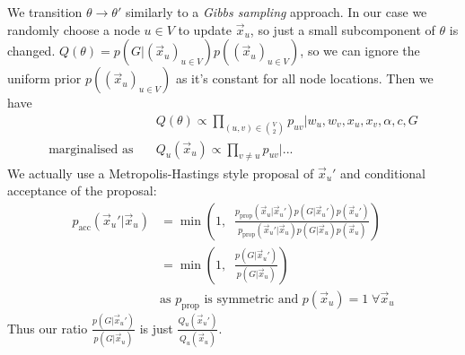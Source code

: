 We transition $\theta \to \theta'$ similarly to a \textit{Gibbs sampling} approach. In our case we randomly choose a node $u \in V$ to update $\vec{x}_u$, so just a small subcomponent of $\theta$ is changed. $Q(\theta) = p(G | (\vec{x}_u)_{u \in V}) p((\vec{x}_u)_{u \in V})$, so we can ignore the uniform prior $p((\vec{x}_u)_{u \in V})$ as it's constant for all node locations. Then we have 
\begin{align}
  & Q(\theta) \propto \prod_{(u,v) \in {V \choose 2}} p_{uv} | w_u, w_v, x_u, x_v, \alpha, c, G
  \\
  \text{marginalised as} \quad & Q_u(\vec{x}_u) \propto \prod_{v \neq u} p_{uv} | ...
\end{align}
We actually use a Metropolis-Hastings style proposal of $\vec{x}_u'$ and conditional acceptance of the proposal:
\begin{align}
  p_{\mathrm{acc}}(\vec{x}_u' | \vec{x}_u) &= \min \left (1,\;\;  \frac{p_{\mathrm{prop}}(\vec{x}_u | \vec{x}_u') p(G | \vec{x}_u') p(\vec{x}_u')}{p_{\mathrm{prop}}(\vec{x}_u' | \vec{x}_u) p(G | \vec{x}_u) p(\vec{x}_u)}\right )
  \\
  &= \min \left (1,\;\;  \frac{p(G | \vec{x}_u')}{p(G | \vec{x}_u)} \right )
  \\
  & \text{as $p_{\mathrm{prop}}$ is symmetric and $p(\vec{x}_u) = 1\; \forall \vec{x}_u$}
\end{align}
Thus our ratio $\frac{p(G | \vec{x}_u')}{p(G | \vec{x}_u)}$ is just $\frac{Q_u(\vec{x}_u')}{Q_u(\vec{x}_u)}$.


